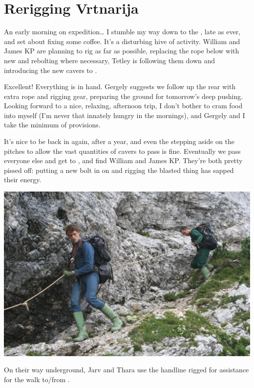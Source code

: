 \section{Rerigging Vrtnarija}



An early morning on expedition\ldots{} I stumble my way down to the
, late as ever, and set about fixing some coffee. It's a disturbing
hive of activity. William and James KP are planning to rig as far as
possible, replacing the rope below  with new and rebolting
where necessary, Tetley is following them down and introducing the new
cavers to .

Excellent! Everything is in hand. Gergely suggests we follow up the rear
with extra rope and rigging gear, preparing the ground for tomorrow's
deep pushing. Looking forward to a nice, relaxing, afternoon trip, I
don't bother to cram food into myself (I'm never that innately hungry in
the mornings), and Gergely and I take the minimum of provisions.

It's nice to be back in  again, after a year, and even
the stepping aside on the pitches to allow the vast quantities of cavers
to pass is fine. Eventually we pass everyone else and get to , and
find William and James KP. They're both pretty pissed off: putting a new
bolt in on  and rigging the blasted thing has sapped their energy.


\begin{pagefigure}
\checkoddpage \ifoddpage \forcerectofloat \else \forceversofloat \fi
   \centering
\includegraphics[width = \textwidth]{2010/expo_stories/20100810-11-17-37 - Jana Carga 35--orig.jpg}
\caption{On their way underground, Jarv and Thara use the handline rigged for assistance for the walk to/from \protect{}. } \label{handline to GW}
\end{pagefigure}


